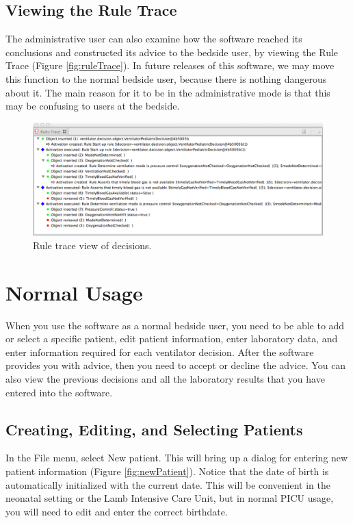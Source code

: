 \subsection{Viewing the Rule Trace}
The administrative user can also examine how the software reached its conclusions and constructed its advice
to the bedside user, by viewing the Rule Trace (Figure \vref{fig:ruleTrace}).  In future releases of this software, we
may move this function to the normal bedside user, because there is nothing dangerous about it.  The main reason
for it to be in the administrative mode is that this may be confusing to users at the bedside.

\begin{figure}[htbp] 
   \centering
   \includegraphics[width=\textwidth]{RuleTrace} 
   \caption{Rule trace view of decisions.}
   \label{fig:ruleTrace}
\end{figure}


\section{Normal Usage}

When you use the software as a normal bedside user, you need to be able to add or select a specific patient,
edit patient information, enter laboratory data, and enter information required for each ventilator decision.
After the software provides you with advice, then you need to accept or decline the advice.  You can also view 
the previous decisions and all the laboratory results that you have entered into the software.\\

\subsection{Creating, Editing, and Selecting Patients}
In the File menu, select New patient.  This will bring up a dialog for entering new patient information (Figure \vref{fig:newPatient}).  Notice that the date of birth is automatically initialized with the current date.  This
will be convenient in the neonatal setting or the Lamb Intensive Care Unit, but in normal PICU usage, you
will need to edit and enter the correct birthdate.\\

